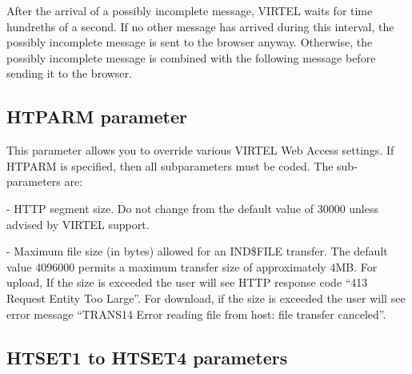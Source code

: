 \documentclass[letterpaper,10pt,english]{sphinxmanual}
\begin{document}
After the arrival of a possibly incomplete message, VIRTEL waits for time hundreths of a second. If no other message has arrived during this interval, the possibly incomplete message is sent to the browser anyway. Otherwise, the possibly incomplete message is combined with the following message before sending it to the browser.

\ignorespaces 

\subsection{HTPARM parameter}
\label{\detokenize{Installation_Guide:htparm-parameter}}\label{\detokenize{Installation_Guide:index-79}}
\begin{sphinxVerbatim}[commandchars=\\\{\}]
                 
\end{sphinxVerbatim}

This parameter allows you to override various VIRTEL Web Access settings. If HTPARM is specified, then all subparameters must be coded. The sub-parameters are:

 - HTTP segment size. Do not change from the default value of 30000 unless advised by VIRTEL support.

 - Maximum file size (in bytes) allowed for an IND\$FILE transfer. The default value 4096000 permits a maximum transfer size of approximately 4MB. For upload, If the size is exceeded the user will see HTTP response code “413 Request Entity Too Large”. For download, if the size is exceeded the user will see error message “TRANS14 Error reading file from host: file transfer canceled”.

\ignorespaces 

\subsection{HTSET1 to HTSET4 parameters}
\label{\detokenize{Installation_Guide:htset1-to-htset4-parameters}}\label{\detokenize{Installation_Guide:index-80}}
\begin{sphinxVerbatim}[commandchars=\\\{\}]
          
\end{sphinxVerbatim}
\end{document}
